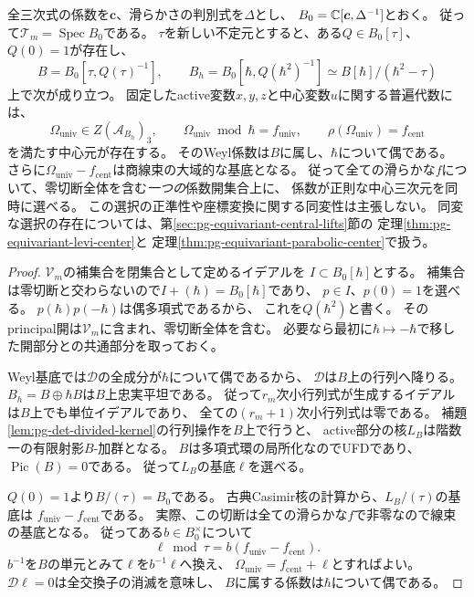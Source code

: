 \begin{theorem}[固定した変数分解の全係数空間における中心元]
\label{thm:pg-det-global-coefficient-lift}
全三次式の係数を$\boldsymbol c$、滑らかさの判別式を$\Delta$とし、
$B_0=\mathbb C[\boldsymbol c,\Delta^{-1}]$とおく。
従って$\mathcal T_m=\operatorname{Spec}B_0$である。
$\tau$を新しい不定元とすると、ある$Q\in B_0[\tau]$、$Q(0)=1$が存在し、
\begin{equation}
 B=B_0[\tau,Q(\tau)^{-1}],\qquad
 B_h=B_0[\hbar,Q(\hbar^2)^{-1}]
 \simeq B[\hbar]/(\hbar^2-\tau)
 \label{eq:pg-det-even-coefficient-rings}
\end{equation}
上で次が成り立つ。
固定したactive変数$x,y,z$と中心変数$u$に関する普遍代数には、
\begin{equation}
 \Omega_{\mathrm{univ}}\in Z(\mathcal A_{B_h})_3,
 \qquad
 \Omega_{\mathrm{univ}}\bmod\hbar=f_{\mathrm{univ}},
 \qquad
 \rho(\Omega_{\mathrm{univ}})=f_{\mathrm{cent}}
 \label{eq:pg-det-global-center}
\end{equation}
を満たす中心元が存在する。
そのWeyl係数は$B$に属し、$\hbar$について偶である。
さらに$\Omega_{\mathrm{univ}}-f_{\mathrm{cent}}$は商線束の大域的な基底となる。
従って全ての滑らかな$f$について、零切断全体を含む\emph{一つの}係数開集合上に、
係数が正則な中心三次元を同時に選べる。
この選択の正準性や座標変換に関する同変性は主張しない。
同変な選択の存在については、第\ref{sec:pg-equivariant-central-lifts}節の
定理\ref{thm:pg-equivariant-levi-center}と
定理\ref{thm:pg-equivariant-parabolic-center}で扱う。
\end{theorem}
\begin{proof}
$\mathcal V_m$の補集合を閉集合として定めるイデアルを
$I\subset B_0[\hbar]$とする。
補集合は零切断と交わらないので$I+(\hbar)=B_0[\hbar]$であり、
$p\in I$、$p(0)=1$を選べる。
$p(\hbar)p(-\hbar)$は偶多項式であるから、
これを$Q(\hbar^2)$と書く。
そのprincipal開は$\mathcal V_m$に含まれ、零切断全体を含む。
必要なら最初に$\hbar\mapsto-\hbar$で移した開部分との共通部分を取っておく。

Weyl基底では$\mathcal D$の全成分が$\hbar$について偶であるから、
$\mathcal D$は$B$上の行列へ降りる。
$B_h=B\oplus\hbar B$は$B$上忠実平坦である。
従って$r_m$次小行列式が生成するイデアルは$B$上でも単位イデアルであり、
全ての$(r_m+1)$次小行列式は零である。
補題\ref{lem:pg-det-divided-kernel}の行列操作を$B$上で行うと、
active部分の核$L_B$は階数一の有限射影$B$-加群となる。
$B$は多項式環の局所化なのでUFDであり、
$\operatorname{Pic}(B)=0$である\cite[Tag~0BCH]{PStacks}。
従って$L_B$の基底$\ell$を選べる。

$Q(0)=1$より$B/(\tau)=B_0$である。
古典Casimir核の計算から、$L_B/(\tau)$の基底は
$f_{\mathrm{univ}}-f_{\mathrm{cent}}$である。
実際、この切断は全ての滑らかな$f$で非零なので線束の基底となる。
従ってある$b\in B_0^\times$について
\begin{equation}
 \ell\bmod\tau=b(f_{\mathrm{univ}}-f_{\mathrm{cent}}).
 \label{eq:pg-det-global-generator-normalization}
\end{equation}
$b^{-1}$を$B$の単元とみて$\ell$を$b^{-1}\ell$へ換え、
$\Omega_{\mathrm{univ}}=f_{\mathrm{cent}}+\ell$とすればよい。
$\mathcal D\ell=0$は全交換子の消滅を意味し、
$B$に属する係数は$\hbar$について偶である。
\end{proof}

